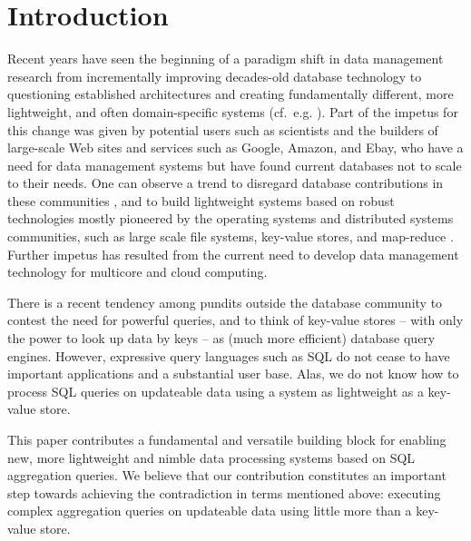 \section{Introduction}


Recent years have seen the beginning of a paradigm shift in data management
research from incrementally
improving decades-old database technology
%
%
to questioning established
architectures and creating fundamentally different, more lightweight, and
often domain-specific systems (cf.\ e.g. \cite{DBLP:conf/vldb/StonebrakerMAHHH07,DBLP:journals/pvldb/KallmanKNPRZJMSZHA08}).
Part of the impetus for this change was given by 
potential users such as scientists and the builders of
large-scale Web sites and services such as Google, Amazon, and Ebay,
who have a need for data management systems but have found current databases
not to scale to their needs.
One can observe a trend to disregard database contributions
in these communities \cite{dbcolumn, DBLP:conf/sigmod/PavloPRADMS09}, and to build lightweight systems based on
robust technologies mostly pioneered by the operating systems and distributed
systems communities, such as large scale file systems, key-value stores, and
map-reduce
\cite{DBLP:journals/cacm/DeanG08, DBLP:journals/tocs/ChangDGHWBCFG08}.
Further impetus has resulted from the current need to develop data management
technology for multicore and cloud computing.
%

There is a recent tendency among pundits outside the database community to
contest the need for powerful queries, and to
think of key-value stores -- with only the power to look up data by
keys -- as (much more efficient) database query engines.
%
%
However, expressive query languages such as SQL do not cease to have
important applications and a substantial user base.
Alas, we do not know how to process SQL queries on updateable data
using a system as lightweight as a key-value store.

This paper contributes a fundamental and versatile building block for
enabling new, more lightweight and nimble data processing systems based
on SQL aggregation que\-ries. We believe that our contribution
constitutes an important
step towards achieving the contradiction in terms mentioned
above: executing complex aggregation queries on updateable data
using little more than a key-value store.


